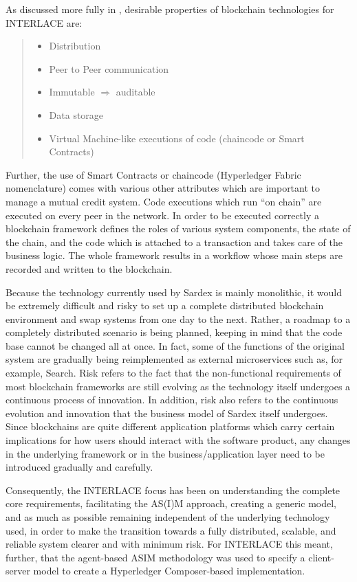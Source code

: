 As discussed more fully in \cite{INTERLACE_D22}, desirable properties of blockchain technologies for INTERLACE are:
\begin{quote}
\begin{itemize}
	\item Distribution
	\item Peer to Peer communication
	\item Immutable $\Rightarrow$ auditable 
	\item Data storage
	\item Virtual Machine-like executions of code (chaincode or Smart Contracts)
\end{itemize}
\end{quote}

Further, the use of Smart Contracts or chaincode (Hyperledger Fabric nomenclature) comes with various other attributes which are important to manage a mutual credit system. Code executions which run ``on chain'' are executed on every peer in the network. In order to be executed correctly a blockchain framework defines the roles of various system components, the state of the chain, and the code which is attached to a transaction and takes care of the business logic. The whole framework results in a workflow whose main steps are recorded and written to the blockchain.

Because the technology currently used by Sardex is mainly monolithic, it would be extremely difficult and risky to set up a complete distributed blockchain environment and swap systems from one day to the next. Rather, a roadmap to a completely distributed scenario is being planned, keeping in mind that the code base cannot be changed all at once. In fact, some of the functions of the original system are gradually being reimplemented as external microservices such as, for example, Search. Risk refers to the fact that the non-functional requirements of most blockchain frameworks are still evolving as the technology itself undergoes a continuous process of innovation. In addition, risk also refers to the continuous evolution and innovation that the business model of Sardex itself undergoes. Since blockchains are quite different application platforms which carry certain implications for how users should interact with the software product, any changes in the underlying framework or in the business/application layer need to be introduced gradually and carefully.

Consequently, the INTERLACE focus has been on understanding the complete core requirements, facilitating the AS(I)M approach, creating a generic model, and as much as possible remaining independent of the underlying technology used, in order to make the transition towards a fully distributed, scalable, and reliable system clearer and with minimum risk. For INTERLACE this meant, further, that the agent-based ASIM methodology was used to specify a client-server model to create a Hyperledger Composer-based implementation.

